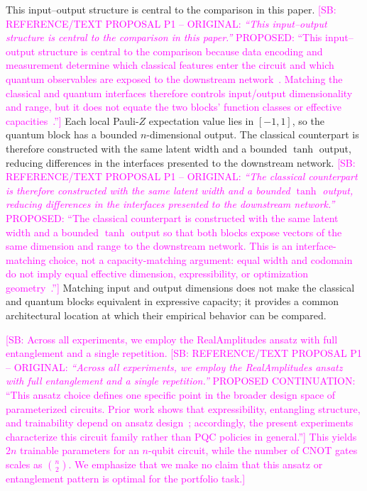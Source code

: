 \documentclass[aps,floatfix,superscriptaddress,twocolumn,tightenlines,amsmath,amssymb,nofootinbib,10pt,longbibliography,prl]{revtex4-2}
\newcommand{\sam}[1]{\textcolor{magenta}{[SB: {#1}]}}
\begin{document}
This input--output structure is central to the comparison in this paper.
\sam{REFERENCE/TEXT PROPOSAL P1 -- ORIGINAL: \textit{``This input--output structure is central to the comparison in this paper.''} PROPOSED: ``This input--output structure is central to the comparison because data encoding and measurement determine which classical features enter the circuit and which quantum observables are exposed to the downstream network~\cite{Schuld2021Effectofdataencodi}. Matching the classical and quantum interfaces therefore controls input/output dimensionality and range, but it does not equate the two blocks' function classes or effective capacities~\cite{Haug2021CapacityQuantumGeometry}.''} Each local Pauli-$Z$ expectation value lies in $[-1,1]$, so the quantum block has a bounded $n$-dimensional output. The classical counterpart is therefore constructed with the same latent width and a bounded $\tanh$ output, reducing differences in the interfaces presented to the downstream network.
\sam{REFERENCE/TEXT PROPOSAL P1 -- ORIGINAL: \textit{``The classical counterpart is therefore constructed with the same latent width and a bounded $\tanh$ output, reducing differences in the interfaces presented to the downstream network.''} PROPOSED: ``The classical counterpart is constructed with the same latent width and a bounded $\tanh$ output so that both blocks expose vectors of the same dimension and range to the downstream network. This is an interface-matching choice, not a capacity-matching argument: equal width and codomain do not imply equal effective dimension, expressibility, or optimization geometry~\cite{Haug2021CapacityQuantumGeometry,Holmes2022ConnectingAnsatzEx}.''} Matching input and output dimensions does not make the classical and quantum blocks equivalent in expressive capacity; it provides a common architectural location at which their empirical behavior can be compared.

\sam{ Across all experiments, we employ the RealAmplitudes ansatz with full entanglement and a single repetition.
\sam{REFERENCE/TEXT PROPOSAL P1 -- ORIGINAL: \textit{``Across all experiments, we employ the RealAmplitudes ansatz with full entanglement and a single repetition.''} PROPOSED CONTINUATION: ``This ansatz choice defines one specific point in the broader design space of parameterized circuits. Prior work shows that expressibility, entangling structure, and trainability depend on ansatz design~\cite{Sim2019ExpressibilityandE,Holmes2022ConnectingAnsatzEx}; accordingly, the present experiments characterize this circuit family rather than PQC policies in general.''} This yields $2n$ trainable parameters for an $n$-qubit circuit, while the number of CNOT gates scales as $\binom{n}{2}$. We emphasize that we make no claim that this ansatz or entanglement pattern is optimal for the portfolio task.}
\end{document}
